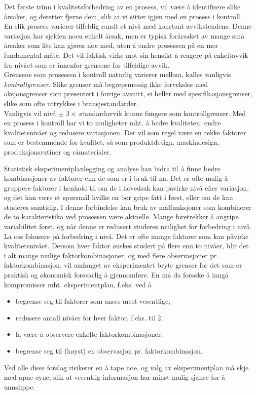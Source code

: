 Det første trinn i kvalitetsforbedring av en prosess, vil være å
identifisere slike årsaker, og deretter fjerne dem, slik at vi sitter
igjen med en prosess i kontroll.
En slik prosess varierer tilfeldig rundt et nivå med konstant 
avvikstendens.  Denne variasjon har sjelden noen enkelt årsak,
men er typisk forårsaket av mange små årsaker som lite kan 
gjøres noe med, uten å endre prosessen på en mer fundamental
måte.  Det vil faktisk virke mot sin hensikt å reagere på 
enkeltavvik fra nivået som er innenfor grensene for tilfeldige avvik.\\

 Grensene som prosessen i kontroll naturlig varierer mellom,
kalles vanligvis {\em kontrollgrenser}. Slike grenser må begrepsmessig ikke
forveksles med aksjonsgrenser som presentert i forrige avsnitt, ei
heller med spesifikasjonsgrenser, slike som ofte uttrykkes i 
bransjestandarder.\\

Vanligvis vil nivå $\pm$ $3\times$ standardavvik kunne fungere som
kontrollgrenser.
Med en prosess i kontroll har vi to muligheter mht. å bedre 
kvaliteten: endre kvalitetsnivået og redusere variasjonen.  Det vil
som regel være en rekke faktorer som er bestemmende for kvalitet,
så som produktdesign, maskindesign, produksjonsrutiner og
råmaterialer.

Statistisk eksperimentplanlegging og analyse kan bidra til å finne
bedre kombinasjoner av faktorer enn de som er i bruk til nå.  Det er
ofte mulig å gruppere faktorer i henhold til om de i hovedsak kan
påvirke nivå eller varia\-sjon, og det kan være et 
spørsmål hvilke en bør gripe fatt i først, eller om de kan 
studeres samtidig.  I denne forbindelse kan bruk av  målfunksjoner
som kombinerer de to karakteristika ved prosessen være aktuelle.
Mange foretrekker å angripe variabilitet først, og når denne
er redusert studeres mulighet for forbedring i nivå.  La oss fokusere
på forbedring i nivå.  Det er ofte mange faktorer som kan 
påvirke kvalitetsnivået.  Dersom hver faktor ønskes
studert på flere enn to nivåer, blir det i alt mange mulige 
faktorkombinasjoner, og med flere observasjoner pr. faktorkombinasjon,
vil omfanget av eksperimentet bryte grenser for det som er praktisk og
økonomisk forsvarlig å gjennomføre.  En må da forsøke 
å inngå kompromisser mht. eksperimentplan, f.eks. ved å
\begin{itemize}
\item  begrense seg til faktorer som anses mest vesentlige,     
\item  redusere antall nivåer for hver faktor, f.eks. til 2,
\item  la være å observere enkelte faktorkombinasjoner, 
\item  begrense seg til (høyst) en observasjon pr. faktorkombinasjon.  
\end{itemize}
Ved alle disse forslag risikerer en å tape noe, og valg av 
eksperimentplan må skje med åpne øyne, slik at vesentlig
informasjon har minst mulig sjanse for å unnslippe.

